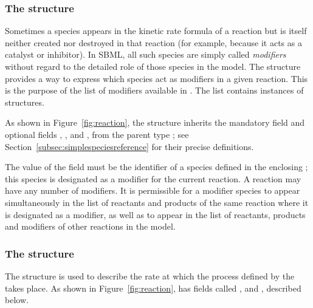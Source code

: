 \subsubsection{The  structure}
\label{subsec:modifierreference}

Sometimes a species appears in the kinetic rate formula of a
reaction but is itself neither created nor destroyed in that
reaction (for example, because it acts as a catalyst or
inhibitor).  In SBML, all such species are simply called
\emph{modifiers} without regard to the detailed role of those
species in the model.  The \Reaction structure provides a way to
express which species act as modifiers in a given reaction.  This
is the purpose of the list of modifiers available in \Reaction.
The list contains instances of \ModifierSpeciesReference
structures.

As shown in Figure~\vref{fig:reaction}, the
\ModifierSpeciesReference structure inherits the mandatory field
 and optional fields , , and
, from the parent type \SimpleSpeciesReference; see
Section~\ref{subsec:simplespeciesreference} for their precise
definitions.

The value of the  field must be the identifier of a
species defined in the enclosing \Model; this species is
designated as a modifier for the current reaction.  A reaction may
have any number of modifiers.  It is permissible for a modifier
species to appear simultaneously in the list of reactants and
products of the same reaction where it is designated as a
modifier, as well as to appear in the list of reactants, products
and modifiers of other reactions in the model.


\subsubsection{The  structure}
\label{subsec:kinetic-law}

The \KineticLaw structure is used to describe the rate at which
the process defined by the \Reaction takes place.  As shown in
Figure~\vref{fig:reaction}, \KineticLaw has fields called
,  and , described
below.

